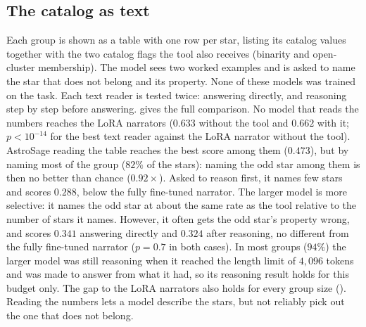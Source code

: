 \subsection{The catalog as text}\label{app:text}
Each group is shown as a table with one row per star, listing its catalog values together with
the two catalog flags the tool also receives (binarity and open-cluster membership). The model
sees two worked examples and is asked to name the star that does not belong and its property.
None of these models was trained on the task.
Each text reader is tested twice: answering directly, and reasoning step by step before
answering.  gives the full comparison.
No model that reads the numbers reaches the LoRA narrators ($0.633$ without the tool and
$0.662$ with it; $p<10^{-14}$ for the best text reader against the LoRA narrator without the
tool). AstroSage reading the table reaches the best score among them ($0.473$),
but by naming most of the group ($82\%$ of the stars): naming the odd star among
them is then no better than chance ($0.92\times$). Asked to reason first, it
names few stars and scores $0.288$, below the fully fine-tuned narrator. The
larger model is more selective: it names the odd star at about the same rate as
the tool relative to the number of stars it names. However, it often gets the
odd star's property wrong, and scores $0.341$ answering directly and $0.324$
after reasoning, no different from the fully fine-tuned narrator ($p{=}0.7$ in
both cases). In most groups ($94\%$) the larger model was still reasoning when
it reached the length limit of $4{,}096$ tokens and was made to answer from what
it had, so its reasoning result holds for this budget only. The gap to the LoRA narrators
also holds for every group size (). Reading the numbers
lets a model describe the stars, but not reliably pick out the one that does
not belong.

